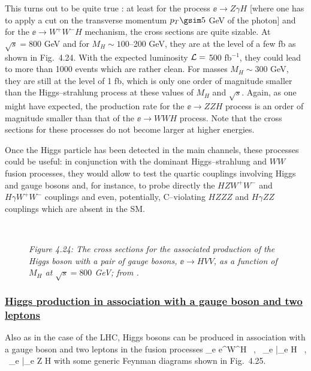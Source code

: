 {This turns out to be quite true \cite{ee-HVff,ee-HVV,DWP}: at least for the
process $\ee \to Z\gamma H$ [where one has to apply a cut on the transverse
momentum $p_T \gsim 5$ GeV of the photon] and for the $\ee \to W^+W^- H$
mechanism, the cross sections are quite sizable. At $\sqrt{s}= 800$ GeV and
for $M_H\sim 100$--200 GeV, they are at the level of a few fb as shown in
Fig.~4.24. With the expected luminosity ${\cal L}=$ 500 fb$^{-1}$, they could 
lead to more than 1000 events which are rather clean. For masses $M_H \sim 300$
GeV, they are still at the level of 1 fb, which is only one order of magnitude
smaller than the Higgs--strahlung process at these values of $M_H$ and
$\sqrt{s}$.  Again, as one might have expected, the production rate for the
$\ee \to ZZH$ process is an order of magnitude smaller than that of the  $\ee
\to WWH$ process. Note that the cross sections for these processes do not
become larger at higher energies. \s

Once the Higgs particle has been detected in the main channels, these processes
could be useful: in conjunction with the dominant Higgs--strahlung and $WW$
fusion processes, they would allow to test the quartic couplings involving
Higgs and gauge bosons and, for instance, to probe directly the $HZW^+W^-$ and
$H\gamma W^+W^-$ couplings and even, potentially, C--violating $HZZZ$ and
$H\gamma ZZ$ couplings which are absent in the SM.  

\begin{figure}[htbp]
\vspace*{1mm}
\begin{center}
\\[3mm]
\end{center}
\vspace*{-2mm}
{\it Figure 4.24: The cross sections for the associated production of the
Higgs boson with a pair of gauge bosons, $\ee \to HVV$, as a function of 
$M_H$ at $\sqrt{s}=800$ GeV; from \cite{DWP}.}
\end{figure}

\subsubsection*{\underline{Higgs production in association with a gauge boson
and two leptons}}

Also as in the case of the LHC, Higgs bosons can be produced in association
with a gauge boson and two leptons in the fusion processes \cite{ee-HVff,DWP} 
\beq 
\ee \to \nu_e e^\pm W^\mp H \ , \ \nu_e \bar{\nu}_e \gamma H \ , \
\nu_e \bar{\nu}_e Z H 
\eeq
with some generic Feynman diagrams shown in Fig.~4.25. \s

}
